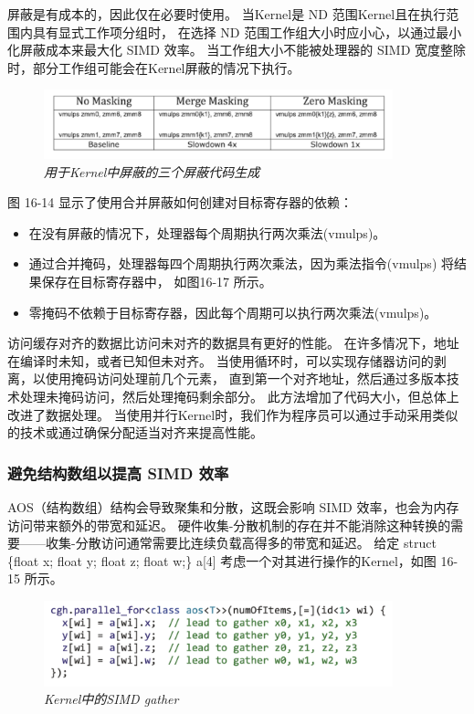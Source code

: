 屏蔽是有成本的，因此仅在必要时使用。 当Kernel是 ND 范围Kernel且在执行范围内具有显式工作项分组时，
在选择 ND 范围工作组大小时应小心，以通过最小化屏蔽成本来最大化 SIMD 效率。 
当工作组大小不能被处理器的 SIMD 宽度整除时，部分工作组可能会在Kernel屏蔽的情况下执行。

\begin{figure}[H]
	\centering
	\includegraphics[width=0.9\textwidth]{figs/F16.14.png}
	\caption{\textit{用于Kernel中屏蔽的三个屏蔽代码生成 }}
\end{figure}

图 16-14 显示了使用合并屏蔽如何创建对目标寄存器的依赖：

\begin{itemize}
	\item 在没有屏蔽的情况下，处理器每个周期执行两次乘法(vmulps)。

	\item 通过合并掩码，处理器每四个周期执行两次乘法，因为乘法指令(vmulps) 将结果保存在目标寄存器中，
	如图16-17 所示。

	\item 零掩码不依赖于目标寄存器，因此每个周期可以执行两次乘法(vmulps)。
\end{itemize}

访问缓存对齐的数据比访问未对齐的数据具有更好的性能。 在许多情况下，地址在编译时未知，或者已知但未对齐。 
当使用循环时，可以实现存储器访问的剥离，以使用掩码访问处理前几个元素，
直到第一个对齐地址，然后通过多版本技术处理未掩码访问，然后处理掩码剩余部分。 
此方法增加了代码大小，但总体上改进了数据处理。 
当使用并行Kernel时，我们作为程序员可以通过手动采用类似的技术或通过确保分配适当对齐来提高性能。

\subsubsection{避免结构数组以提高 SIMD 效率}
AOS（结构数组）结构会导致聚集和分散，这既会影响 SIMD 效率，也会为内存访问带来额外的带宽和延迟。 
硬件收集-分散机制的存在并不能消除这种转换的需要——收集-分散访问通常需要比连续负载高得多的带宽和延迟。 
给定 struct \{float x; float y; float z; float w;\} a[4]
考虑一个对其进行操作的Kernel，如图 16-15 所示。

\begin{figure}[H]
	\centering
	\includegraphics[width=0.9\textwidth]{figs/F16.15.png}
	\caption{\textit{Kernel中的SIMD gather }}
\end{figure}

